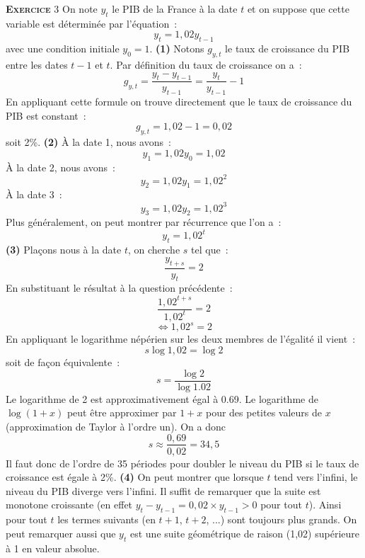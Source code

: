 \documentclass[10pt,a4paper,notitlepage]{article}
\newcommand{\exercice}[1]{\textsc{\textbf{Exercice}} #1}
\begin{document}
\bigskip

\exercice{3} On note $y_t$ le PIB de la France à la date $t$ et on
suppose que cette variable est déterminée par  l'équation :
\[
y_t = 1,02 y_{t-1}
\]
avec une condition initiale $y_0 = 1$. \textbf{(1)} Notons $g_{y,t}$
le taux de croissance du PIB entre les dates $t-1$ et $t$. Par
définition du taux de croissance on a :
\[
g_{y,t} = \frac{y_{t}-y_{t-1}}{y_{t-1}} = \frac{y_{t}}{y_{t-1}}-1 
\]
En appliquant cette formule on trouve directement que le taux de
croissance du PIB est constant :
\[
g_{y,t} = 1,02-1 = 0,02
\]
soit 2\%. \textbf{(2)} À la date 1, nous avons :
\[
y_1 = 1,02 y_0 = 1,02
\]
À la date 2, nous avons :
\[
y_2 = 1,02 y_1 = 1,02^2
\]
À la date 3 :
\[
y_3 = 1,02 y_2 = 1,02^3
\]
Plus généralement, on peut montrer par récurrence que l'on a :
\[
y_t = 1,02^t
\]
\textbf{(3)} Plaçons nous à la date $t$, on cherche $s$ tel que :
\[
\frac{y_{t+s}}{y_t} = 2 
\]
En substituant le résultat à la question précédente :
\[
\frac{1,02^{t+s}}{1,02^t} = 2 
\]
\[
\Leftrightarrow 1,02^s = 2 
\]
En appliquant le logarithme népérien sur les deux membres de l'égalité
il vient :
\[
s \log 1,02 = \log 2
\]
soit de façon équivalente :
\[
s = \frac{\log 2}{\log 1.02}
\]
Le logarithme de 2 est approximativement égal à 0.69. Le logarithme de
$\log (1+x)$ peut être approximer par $1+x$ pour des petites valeurs
de $x$ (approximation de Taylor à l'ordre un). On a donc
\[
s \approx \frac{0,69}{0,02} = 34,5
\]
Il faut donc de l'ordre de 35 périodes pour doubler le niveau du PIB
si le taux de croissance est égale à 2\%. \textbf{(4)} On peut montrer
que lorsque $t$ tend vers l'infini, le niveau du PIB diverge vers
l'infini. Il suffit de remarquer que la suite est monotone croissante
(en effet $y_t-y_{t-1} = 0,02\times y_{t-1} > 0 $ pour tout
$t$). Ainsi pour tout $t$ les termes suivants (en $t+1$, $t+2$, ...)
sont toujours plus grands. On peut remarquer aussi que $y_t$ est une
suite géométrique de raison (1,02) supérieure à 1 en valeur absolue.

\bigskip
\end{document}

